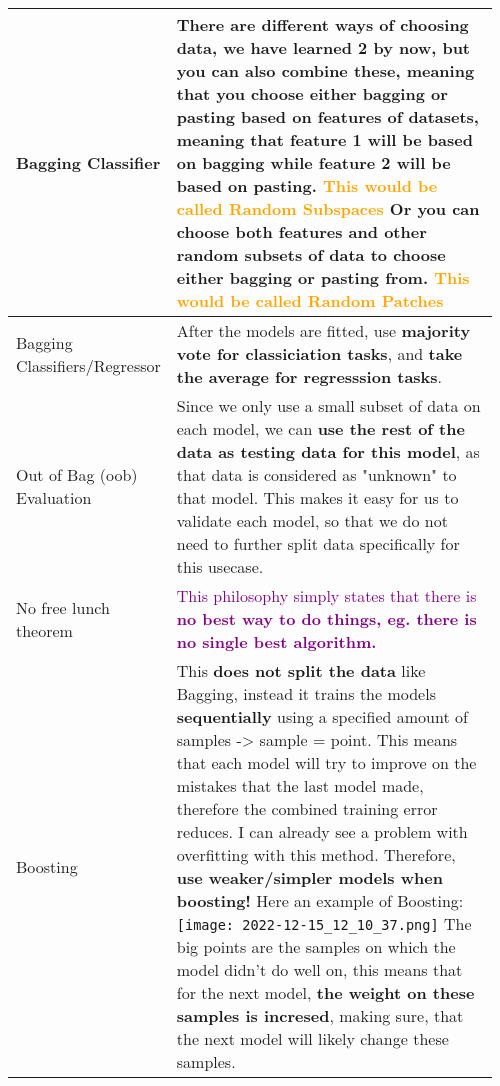 \documentclass[main.tex,fontsize=8pt,paper=a4,paper=portrait,DIV=calc,]{scrartcl}
\begin{document}
\begin{table}[ht!]
\begin{tabular}{|m{0.2\linewidth}|m{0.755\linewidth}|}
\hline
Bagging Classifier & 
There are different ways of choosing data, we have learned 2 by now, but you can also combine these, meaning that you choose either bagging or pasting based on features of datasets, meaning that feature 1 will be based on bagging while feature 2 will be based on pasting. \newline
\textcolor{orange}{This would be called \textbf{Random Subspaces}}\newline
Or you can choose both features and other random subsets of data to choose either bagging or pasting from.\newline
\textcolor{orange}{This would be called \textbf{Random Patches}}
\\
\hline
Bagging Classifiers/Regressor & 
After the models are fitted, use \textbf{majority vote for classiciation tasks}, and \textbf{take the average for regresssion tasks}.\\
\hline
Out of Bag (oob) Evaluation & 
Since we only use a small subset of data on each model, we can \textbf{use the rest of the data as testing data for this model}, as that data is considered as "unknown" to that model.\newline
This makes it easy for us to validate each model, so that we do not need to further split data specifically for this usecase.\\
\hline
No free lunch theorem & 
\textcolor{purple}{This philosophy simply states that there is \textbf{no best way to do things, eg. there is no single best algorithm.}}\\
\hline
Boosting & 
This \textbf{does not split the data} like Bagging, instead it trains the models \textbf{sequentially} using a specified amount of samples -> sample = point. \newline
This means that each model will try to improve on the mistakes that the last model made, therefore the combined training error reduces.\newline
I can already see a problem with overfitting with this method. Therefore, \textbf{use weaker/simpler models when boosting!}\newline
Here an example of Boosting: \newline
\texttt{[image: 2022-12-15\_12\_10\_37.png]}\newline
The big points are the samples on which the model didn't do well on, this means that for the next model, \textbf{the weight on these samples is incresed}, making sure, that the next model will likely change these samples.\newline

\end{tabular}
\end{table}
\end{document}
